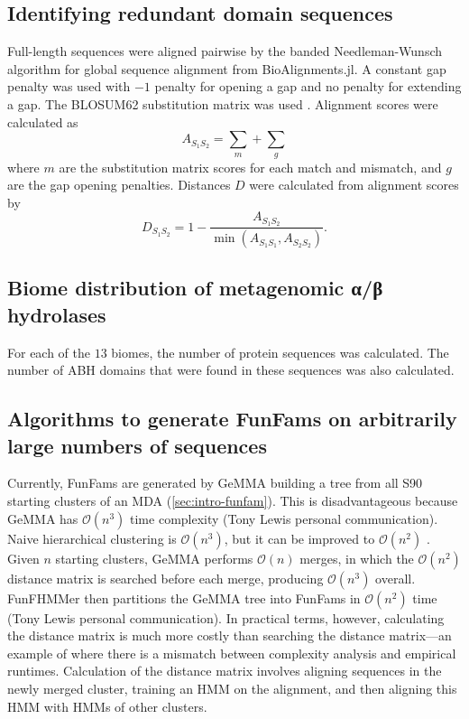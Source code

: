 \subsection{Identifying redundant domain sequences}

Full-length sequences were aligned pairwise by the banded Needleman-Wunsch algorithm \cite{Needleman1970} for global sequence alignment from BioAlignments.jl. A constant gap penalty was used with $-1$ penalty for opening a gap and no penalty for extending a gap. The BLOSUM62 substitution matrix was used \cite{Henikoff1992}. Alignment scores were calculated as
\[
    A_{S_1 S_2} = \sum_m + \sum_g
\]
where $m$ are the substitution matrix scores for each match and mismatch, and $g$ are the gap opening penalties. Distances $D$ were calculated from alignment scores \cite{Katoh2002} by
\[
    D_{S_1 S_2} = 1 - \frac{A_{S_1 S_2}}{\min(A_{S_1 S_1}, A_{S_2 S_2})}.
\]

\subsection{Biome distribution of metagenomic α/β hydrolases}

For each of the $13$ biomes, the number of protein sequences was calculated. The number of ABH domains that were found in these sequences was also calculated.

\subsection{Algorithms to generate FunFams on arbitrarily large numbers of sequences}
\label{methods:fran}

Currently, FunFams are generated by GeMMA building a tree from all S90 starting clusters of an MDA (\ref{sec:intro-funfam}). This is disadvantageous because GeMMA has $\mathcal{O}(n^3)$ time complexity (Tony Lewis personal communication). Naive hierarchical clustering is $\mathcal{O}(n^3)$, but it can be improved to $\mathcal{O}(n^2)$ \cite{Mullner2011}. Given $n$ starting clusters, GeMMA performs $\mathcal{O}(n)$ merges, in which the $\mathcal{O}(n^2)$ distance matrix is searched before each merge, producing $\mathcal{O}(n^3)$ overall.
FunFHMMer then partitions the GeMMA tree into FunFams in $\mathcal{O}(n^2)$ time (Tony Lewis personal communication). In practical terms, however, calculating the distance matrix is much more costly than searching the distance matrix---an example of where there is a mismatch between complexity analysis and empirical runtimes. Calculation of the distance matrix involves aligning sequences in the newly merged cluster, training an HMM on the alignment, and then aligning this HMM with HMMs of other clusters.


